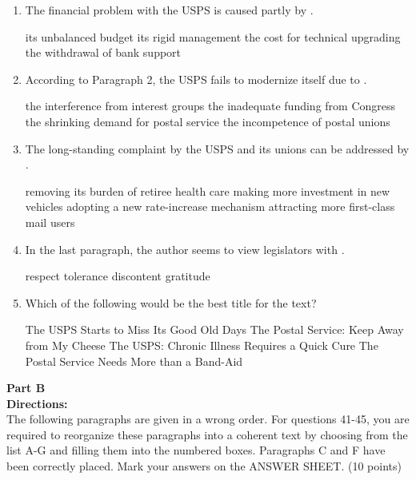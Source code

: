 \begin{enumerate}[resume]
	\item
The financial problem with the USPS is caused partly by \lineread.


\fourchoices
{its unbalanced budget}
{its rigid management}
{the cost for technical upgrading}
{the withdrawal of bank support}


\item
According to Paragraph 2, the USPS fails to modernize itself due to \lineread.


\fourchoices
{the interference from interest groups}
{the inadequate funding from Congress}
{the shrinking demand for postal service}
{the incompetence of postal unions}



\item
The long-standing complaint by the USPS and its unions can be
addressed by \lineread.


\fourchoices
{removing its burden of retiree health care}
{making more investment in new vehicles}
{adopting a new rate-increase mechanism}
{attracting more first-class mail users}

\item
In the last paragraph, the author seems to view legislators with \lineread.


\fourchoices
{respect}
{tolerance}
{discontent}
{gratitude}


\item
Which of the following would be the best title for the text?


\fourchoices
{The USPS Starts to Miss Its Good Old Days}
{The Postal Service: Keep Away from My Cheese}
{The USPS: Chronic Illness Requires a Quick Cure}
{The Postal Service Needs More than a Band-Aid}

	
\end{enumerate}


\newpage

\noindent
\textbf{Part B}\\
\textbf{Directions:}\\
The following paragraphs are given in a wrong order. For questions
41-45, you are required to reorganize these paragraphs into a coherent
text by choosing from the list A-G and filling them into the numbered
boxes. Paragraphs C and F have been correctly placed. Mark your
answers on the ANSWER SHEET. (10 points)


